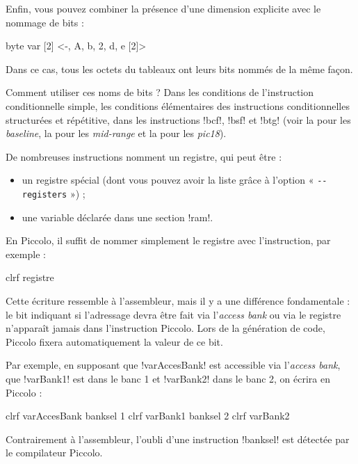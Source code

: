 Enfin, vous pouvez combiner la présence d'une dimension explicite avec le nommage de bits :

\begin{piccolo}
byte var [2] <-, A, b, 2, d, e [2]>
\end{piccolo}

Dans ce cas, tous les octets du tableaux ont leurs bits nommés de la même façon.

Comment utiliser ces noms de bits ? Dans les conditions de l'instruction conditionnelle simple, les conditions élémentaires des instructions conditionnelles structurées et répétitive, dans les instructions \pic!bcf!, \pic!bsf! et \pic!btg! (voir la  pour les \emph{baseline}, la  pour les \emph{mid-range} et la  pour les \emph{pic18}). 



De nombreuses instructions nomment un registre, qui peut être :
\begin{itemize}
  \item un registre spécial (dont vous pouvez avoir la liste grâce à l'option « \texttt{-{}-registers} ») ;
  \item une variable déclarée dans une section \pic!ram!.
\end{itemize}

En Piccolo, il suffit de nommer simplement le registre avec l'instruction, par exemple :
\begin{piccolo}
clrf registre
\end{piccolo}

Cette écriture ressemble à l'assembleur, mais il y a une différence fondamentale : le bit indiquant si l'adressage devra être fait via l'\emph{access bank} ou via le registre  n'apparaît jamais dans l'instruction Piccolo. Lors de la génération de code, Piccolo fixera automatiquement la valeur de ce bit.

Par exemple, en supposant que \pic!varAccesBank! est accessible via l'\emph{access bank}, que \pic!varBank1! est dans le banc 1 et \pic!varBank2! dans le banc 2, on écrira en Piccolo :

\begin{piccolo}
clrf varAccesBank
banksel 1
clrf varBank1
banksel 2
clrf varBank2
\end{piccolo}

Contrairement à l'assembleur, l'oubli d'une instruction \pic!banksel! est détectée par le compilateur Piccolo.

